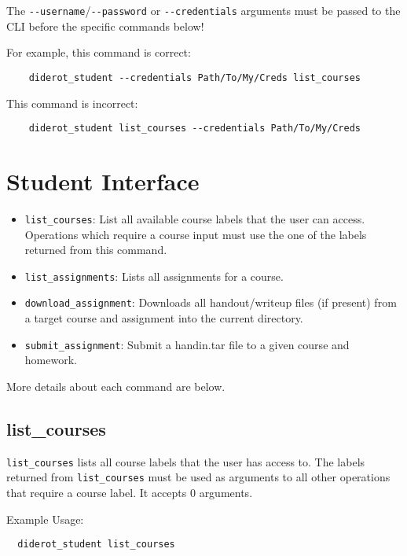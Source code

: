 \begin{note}
  The \verb|--username|/\verb|--password| or \verb|--credentials| arguments must be passed
  to the CLI before the specific commands below!

  For example, this command is correct:
  \begin{verbatim}
    diderot_student --credentials Path/To/My/Creds list_courses
  \end{verbatim}
  
  This command is incorrect:
  \begin{verbatim}
    diderot_student list_courses --credentials Path/To/My/Creds
  \end{verbatim}
\end{note}

\section{Student Interface}

\begin{itemize}
  \item \verb|list_courses|: List all available course labels that the user can access.
    Operations which require a course input must use the one of the labels returned from this command.
  \item \verb|list_assignments|: Lists all assignments for a course.
  \item \verb|download_assignment|: Downloads all handout/writeup files (if present) from a
    target course and assignment into the current directory.
  \item \verb|submit_assignment|: Submit a handin.tar file to a given course and homework.
\end{itemize}

More details about each command are below.

\subsection{list\_courses}

\verb|list_courses| lists all course labels that the user has access to.
%
The labels returned from \verb|list_courses| must be used as arguments to all other
operations that require a course label.
%
It accepts 0 arguments.

Example Usage:
\begin{verbatim}
  diderot_student list_courses
\end{verbatim}

